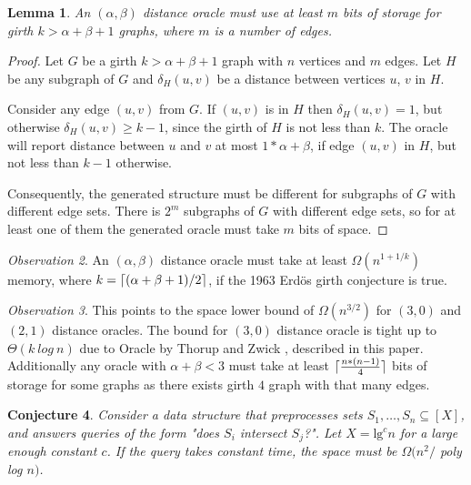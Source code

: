 \documentclass[shortabstract, lic, english]{iithesis}
\theoremstyle{definition} \newtheorem{definition}{Definition}[chapter]
\theoremstyle{remark} \newtheorem{remark}[definition]{Observation}
\theoremstyle{plain} \newtheorem{theorem}[definition]{Theorem}
\theoremstyle{plain} \newtheorem{lemma}[definition]{Lemma}
\theoremstyle{plain} \newtheorem{conjecture}[definition]{Conjecture}
\DeclarePairedDelimiter{\ceil}{\lceil}{\rceil}
\begin{document}
\begin{lemma}
    An $(\alpha, \beta)$ distance oracle 
    must use at least $m$ bits of storage for girth $k > \alpha + \beta + 1$ graphs, where $m$ is a number of edges.
\end{lemma}
\begin{proof}
    Let $G$ be a girth $k > \alpha + \beta + 1$ graph with $n$ vertices and $m$ edges.
    Let $H$ be any subgraph of $G$ and $\delta_H(u,v)$ be a distance between vertices $u$, $v$ in $H$.
    
    Consider any edge $(u, v)$ from $G$.
    If $(u, v)$ is in $H$ then $\delta_H(u,v) = 1$, but otherwise $\delta_H(u,v) \geq k - 1$, since the girth of $H$ is not less than $k$.
    The oracle will report distance between $u$ and $v$ at most $1*\alpha + \beta$, if edge $(u,v)$ in $H$,
    but not less than $k-1$ otherwise. 
    
    Consequently, the generated structure must be different for subgraphs of $G$ with different edge sets.
    There is $2^m$ subgraphs of $G$ with different edge sets, so for at least one of them the generated oracle must take $m$ bits of space.
\end{proof}

\begin{remark}
    An $(\alpha, \beta)$ distance oracle must take at least $\Omega(n^{1+1/k})$ memory, where
    $k=\ceil{(\alpha + \beta + 1)/2}$, if the 1963 Erd{\"o}s girth conjecture is true.
\end{remark}

\begin{remark}
    This points to the space lower bound of $\Omega(n^{3/2})$ for $(3,0)$ and $(2,1)$ distance oracles.
    The bound for $(3, 0)$ distance oracle is tight up to $\Theta(k~log~n)$ due to Oracle by Thorup and Zwick \cite{a0OraclesBasic},
    described in this paper.
    Additionally any oracle with $\alpha + \beta < 3$ must take at least $\ceil{\frac{n*(n-1)}{4}}$ bits of storage for some graphs as there exists girth $4$ graph with that many edges.
\end{remark}

\begin{conjecture} \label{setIntersectionQueries} \cite{21OracleLessMemory}
    Consider a data structure that preprocesses sets $S_1, \ldots, S_n \subseteq [X]$, and answers queries of the form "does $S_i$ intersect $S_j$?".
    Let $X = \text{lg}^c n$ for a large enough constant $c$.
    If the query takes constant time, the space must be $\Omega(n^2 /$ poly log $ n)$.
\end{conjecture}
\end{document}
